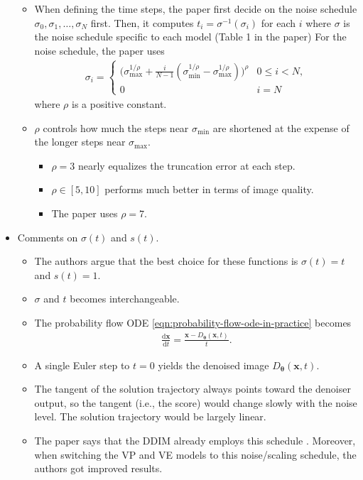 \documentclass[10pt]{article}
\newcommand{\dee}{\mathrm{d}}
\newcommand{\ve}[1]{\mathbf{#1}}
\newcommand{\ves}[1]{\boldsymbol{#1}}
\begin{document}
\begin{itemize}
\begin{itemize}
    \item When defining the time steps, the paper first decide on the noise schedule $\sigma_0, \sigma_1, \dotsc, \sigma_N$ first. Then, it computes $t_i = \sigma^{-1}(\sigma_i)$ for each $i$ where $\sigma$ is the noise schedule specific to each model (Table 1 in the paper) For the noise schedule, the paper uses
    \begin{align*}
      \sigma_i = \begin{cases}
        \big( \sigma_{\max}^{1/\rho} + \frac{i}{N-1}(\sigma_{\min}^{1/\rho} - \sigma_{\max}^{1/\rho}) \big)^{\rho} & 0 \leq i < N, \\
        0 & i = N
      \end{cases}      
    \end{align*}
    where $\rho$ is a positive constant.
    
    \item $\rho$ controls how much the steps near $\sigma_{\min}$ are shortened at the expense of the longer steps near $\sigma_{\max}$.
    \begin{itemize}
      \item $\rho = 3$ nearly equalizes the truncation error at each step.
      \item $\rho \in [5,10]$ performs much better in terms of image quality.
      \item The paper uses $\rho = 7$.
    \end{itemize}
  \end{itemize}

  \item Comments on $\sigma(t)$ and $s(t)$.
  \begin{itemize}
    \item The authors argue that the best choice for these functions is $\sigma(t) = t$ and $s(t) = 1$.
    
    \item $\sigma$ and $t$ becomes interchangeable.
    
    \item The probability flow ODE \eqref{eqn:probability-flow-ode-in-practice} becomes
    \begin{align*}
      \frac{\dee \ve{x}}{\dee t} = \frac{\ve{x} - D_{\ves{\theta}}(\ve{x}, t)}{t}.
    \end{align*}
    
    \item A single Euler step to $t=0$ yields the denoised image $D_{\ves{\theta}}(\ve{x},t)$.
    
    \item The tangent of the solution trajectory always points toward the denoiser output, so the tangent (i.e., the score) would change slowly with the noise level. The solution trajectory would be largely linear.
    
    \item The paper says that the DDIM already employs this schedule \cite{Song:DDIM:2020}. Moreover, when switching the VP and VE models to this noise/scaling schedule, the authors got improved results.
  \end{itemize}
\end{itemize}
\end{document}
